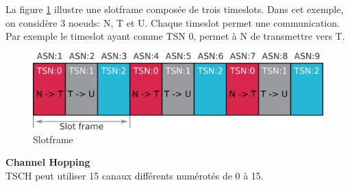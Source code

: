 La figure \ref{todo} illustre une slotframe composée de trois timeslots.
Dans cet exemple, on considère 3 noeuds: N, T et U. Chaque timeslot permet une communication.
Par exemple le timeslot ayant comme TSN 0, permet à N de transmettre vers T.

\begin{figure}[H]
  \centering
  \includegraphics[scale=0.7]{images/sloframe.png}
  \caption{Slotframe}
  \label{todo}
\end{figure}

\textbf{Channel Hopping}\\

TSCH peut utiliser 15 canaux différents numérotés de 0 à 15.
